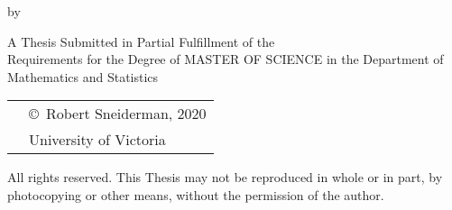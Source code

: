 \pagebreak
{
\centering
\thesistitle
\tpbreak
by
\tpbreak
\nameanddegrees

A Thesis Submitted in Partial Fulfillment of the \\
Requirements for the Degree of
\tpbreak
MASTER OF SCIENCE
\tpbreak
in the Department of Mathematics and Statistics
\vfill
\begin{tabular}{cl}
& \copyright\ Robert Sneiderman, 2020\\
& \phantom{\copyright} University of Victoria
\end{tabular}
\tpbreak
All rights reserved. This Thesis may not be reproduced in whole or in part, by \\
\hfill photocopying or other means, without the permission of the author. 
\hfill
}
\pagebreak
